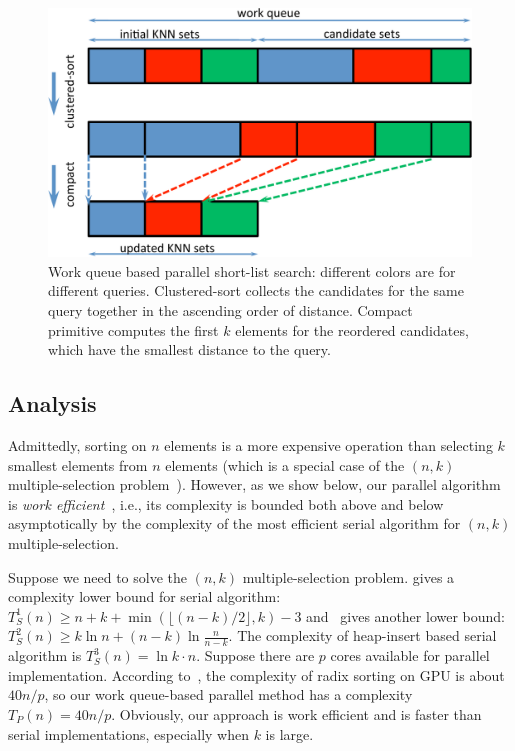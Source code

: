 \begin{figure}[htb]
  \centering
  \includegraphics[width=0.8\linewidth]{figs/6/workqueue.pdf}
  \caption[Work queue based parallel short-list search]{\label{fig:6:workqueue} Work queue based parallel short-list search: different colors are for different queries. Clustered-sort collects the candidates for the same query together in the ascending order of distance. Compact primitive computes the first $k$ elements for the reordered candidates, which have the smallest distance to the query. }
\end{figure}

\subsection{Analysis}

Admittedly, sorting on $n$ elements is a more expensive operation than selecting $k$ smallest elements from $n$ elements (which is a special case of the $(n,k)$ multiple-selection problem~\cite{Knuth:1998:ACP}). However, as we show below, our parallel algorithm is \emph{work efficient}~\cite{Joesphbook}, i.e., its complexity is bounded both above and below asymptotically by the complexity of the most efficient serial algorithm for $(n,k)$ multiple-selection.

Suppose we need to solve the $(n,k)$ multiple-selection problem. \cite{Knuth:1998:ACP} gives a complexity lower bound for serial algorithm: $T_S^1(n) \geq n + k + \min(\lfloor (n-k)/2\rfloor, k) -3$
and~\cite{Kaligosi:2005} gives another lower bound: $T_S^2(n) \geq k \ln n + (n-k)\ln\frac{n}{n-k}$.
The complexity of heap-insert based serial algorithm is $T_S^3(n) = \ln k \cdot n$.
Suppose there are $p$ cores available for parallel implementation. According to~\cite{Merrill:2010:RSG}, the complexity of radix sorting on GPU is about $40 n / p$, so our work queue-based parallel method has a complexity $T_P(n) = 40 n / p$.
Obviously, our approach is work efficient and is faster than serial implementations, especially when $k$ is large.

